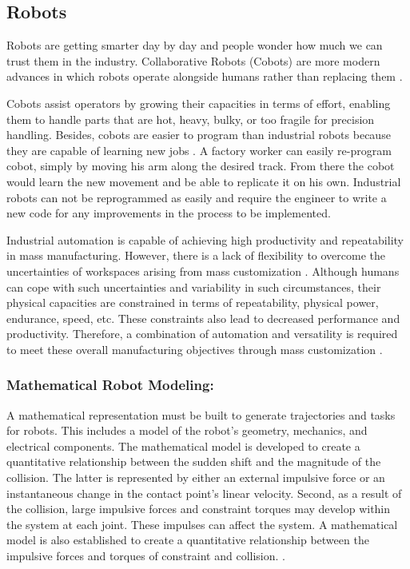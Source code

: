 
\subsection{Robots}
Robots are getting smarter day by day and people wonder how much we can trust them in the industry. Collaborative Robots (Cobots) are more modern advances in which robots operate alongside humans rather than replacing them \cite{pickett_dont_2018}. 

Cobots assist operators by growing their capacities in terms of effort, enabling them to handle parts that are hot, heavy, bulky, or too fragile for precision handling. Besides, cobots are easier to program than industrial robots because they are capable of learning new jobs \cite{schmidbauer_teaching_2020}. A factory worker can easily re-program cobot, simply by moving his arm along the desired track. From there the cobot would learn the new movement and be able to replicate it on his own. Industrial robots can not be reprogrammed as easily and require the engineer to write a new code for any improvements in the process to be implemented.

Industrial automation is capable of achieving high productivity and repeatability in mass manufacturing. However, there is a lack of flexibility to overcome the uncertainties of workspaces arising from mass customization \cite{accorsi_application_2019}. Although humans can cope with such uncertainties and variability in such circumstances, their physical capacities are constrained in terms of repeatability, physical power, endurance, speed, etc. These constraints also lead to decreased performance and productivity. Therefore, a combination of automation and versatility is required to meet these overall manufacturing objectives through mass customization \cite{el_zaatari_cobot_2019}.   

\subsubsection*{Mathematical Robot Modeling:}
A mathematical representation must be built to generate trajectories and tasks for robots. This includes a model of the robot's geometry, mechanics, and electrical components. The mathematical model is developed to create a quantitative relationship between the sudden shift and the magnitude of the collision. The latter is represented by either an external impulsive force or an instantaneous change in the contact point's linear velocity. Second, as a result of the collision, large impulsive forces and constraint torques may develop within the system at each joint. These impulses can affect the system. A mathematical model is also established to create a quantitative relationship between the impulsive forces and torques of constraint and collision.  \cite{zheng_mathematical_1985}.

